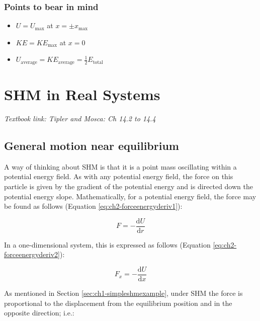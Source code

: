 \documentclass[
]{book}
\providecommand{\tightlist}{%
  \setlength{\itemsep}{0pt}\setlength{\parskip}{0pt}}
\begin{document}
\hypertarget{points-to-bear-in-mind}{%
\subsection{Points to bear in mind}\label{points-to-bear-in-mind}}

\begin{itemize}
\tightlist
\item
  \(U = U_\mathrm{max}\) at \(x = ±x_\mathrm{max}\)
\item
  \(KE = KE_\mathrm{max}\) at \(x = 0\)
\item
  \(U_\mathrm{average} = KE_\mathrm{average} = \frac{1}{2}E_\mathrm{total}\)
\end{itemize}

\hypertarget{sec:shm-real}{%
\chapter{SHM in Real Systems}\label{sec:shm-real}}

\emph{Textbook link: Tipler and Mosca: Ch 14.2 to 14.4}

\hypertarget{general-motion-near-equilibrium}{%
\section{General motion near equilibrium}\label{general-motion-near-equilibrium}}

A way of thinking about SHM is that it is a point mass oscillating within a potential energy field. As with any potential energy field, the force on this particle is given by the gradient of the potential energy and is directed down the potential energy slope. Mathematically, for a potential energy field, the force may be found as follows (Equation \eqref{eq:ch2-forceenergyderiv1}):

\begin{equation}
F = - \frac{\mathrm{d}U}{\mathrm{d}r}
\label{eq:ch2-forceenergyderiv1}
\end{equation}

In a one-dimensional system, this is expressed as follows (Equation \eqref{eq:ch2-forceenergyderiv2}):

\begin{equation}
F_x = - \frac{\mathrm{d}U}{\mathrm{d}x}
\label{eq:ch2-forceenergyderiv2}
\end{equation}

As mentioned in Section \ref{sec:ch1-simpleshmexample}, under SHM the force is proportional to the displacement from the equilibrium position and in the opposite direction; i.e.:
\end{document}
